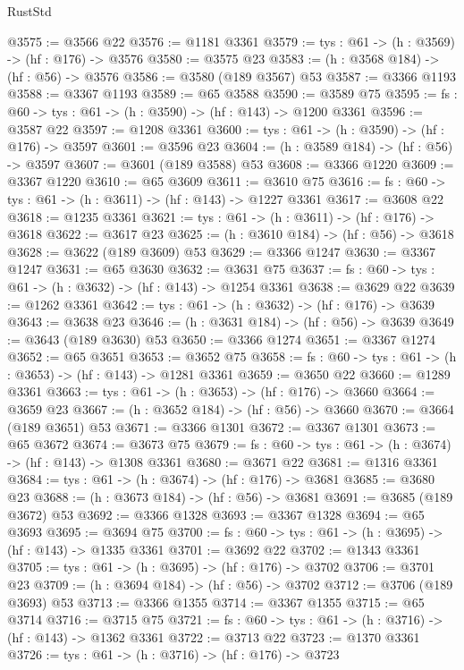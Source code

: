 \begin{lexlean}{RustStd}
\begin{coremodule}
@3575 := @3566 @22
@3576 := @1181 @3361
@3579 := {tys : @61} -> (h : @3569) -> (hf : @176) -> @3576
@3580 := @3575 @23
@3583 := (h : @3568 @184) -> (hf : @56) -> @3576
@3586 := @3580 (@189 @3567) @53
@3587 := @3366 @1193
@3588 := @3367 @1193
@3589 := @65 @3588
@3590 := @3589 @75
@3595 := {fs : @60} -> {tys : @61} -> (h : @3590) -> (hf : @143) -> @1200 @3361
@3596 := @3587 @22
@3597 := @1208 @3361
@3600 := {tys : @61} -> (h : @3590) -> (hf : @176) -> @3597
@3601 := @3596 @23
@3604 := (h : @3589 @184) -> (hf : @56) -> @3597
@3607 := @3601 (@189 @3588) @53
@3608 := @3366 @1220
@3609 := @3367 @1220
@3610 := @65 @3609
@3611 := @3610 @75
@3616 := {fs : @60} -> {tys : @61} -> (h : @3611) -> (hf : @143) -> @1227 @3361
@3617 := @3608 @22
@3618 := @1235 @3361
@3621 := {tys : @61} -> (h : @3611) -> (hf : @176) -> @3618
@3622 := @3617 @23
@3625 := (h : @3610 @184) -> (hf : @56) -> @3618
@3628 := @3622 (@189 @3609) @53
@3629 := @3366 @1247
@3630 := @3367 @1247
@3631 := @65 @3630
@3632 := @3631 @75
@3637 := {fs : @60} -> {tys : @61} -> (h : @3632) -> (hf : @143) -> @1254 @3361
@3638 := @3629 @22
@3639 := @1262 @3361
@3642 := {tys : @61} -> (h : @3632) -> (hf : @176) -> @3639
@3643 := @3638 @23
@3646 := (h : @3631 @184) -> (hf : @56) -> @3639
@3649 := @3643 (@189 @3630) @53
@3650 := @3366 @1274
@3651 := @3367 @1274
@3652 := @65 @3651
@3653 := @3652 @75
@3658 := {fs : @60} -> {tys : @61} -> (h : @3653) -> (hf : @143) -> @1281 @3361
@3659 := @3650 @22
@3660 := @1289 @3361
@3663 := {tys : @61} -> (h : @3653) -> (hf : @176) -> @3660
@3664 := @3659 @23
@3667 := (h : @3652 @184) -> (hf : @56) -> @3660
@3670 := @3664 (@189 @3651) @53
@3671 := @3366 @1301
@3672 := @3367 @1301
@3673 := @65 @3672
@3674 := @3673 @75
@3679 := {fs : @60} -> {tys : @61} -> (h : @3674) -> (hf : @143) -> @1308 @3361
@3680 := @3671 @22
@3681 := @1316 @3361
@3684 := {tys : @61} -> (h : @3674) -> (hf : @176) -> @3681
@3685 := @3680 @23
@3688 := (h : @3673 @184) -> (hf : @56) -> @3681
@3691 := @3685 (@189 @3672) @53
@3692 := @3366 @1328
@3693 := @3367 @1328
@3694 := @65 @3693
@3695 := @3694 @75
@3700 := {fs : @60} -> {tys : @61} -> (h : @3695) -> (hf : @143) -> @1335 @3361
@3701 := @3692 @22
@3702 := @1343 @3361
@3705 := {tys : @61} -> (h : @3695) -> (hf : @176) -> @3702
@3706 := @3701 @23
@3709 := (h : @3694 @184) -> (hf : @56) -> @3702
@3712 := @3706 (@189 @3693) @53
@3713 := @3366 @1355
@3714 := @3367 @1355
@3715 := @65 @3714
@3716 := @3715 @75
@3721 := {fs : @60} -> {tys : @61} -> (h : @3716) -> (hf : @143) -> @1362 @3361
@3722 := @3713 @22
@3723 := @1370 @3361
@3726 := {tys : @61} -> (h : @3716) -> (hf : @176) -> @3723

\end{coremodule}
\end{lexlean}
